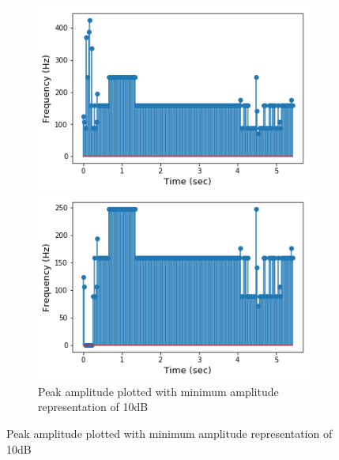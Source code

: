 \begin{figure}[H]
\centering
\begin{subfigure}{0.49\textwidth}
\centering
\includegraphics[width=\textwidth]{figures/peak_detection/20170511_-3.png}
\caption{Peak amplitude plotted with minimum amplitude representation of -3dB}
\label{fig:freq_-3dB_Amp_pass}

\includegraphics[width=\textwidth]{figures/peak_detection/20170511_10.png}
\caption{Peak amplitude plotted with minimum amplitude representation of 10dB}
\label{fig:freq_10dB_Amp_pass}


\end{subfigure}
\end{figure}
